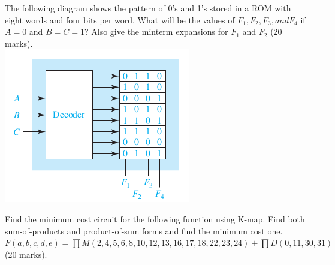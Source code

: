 \begin{prob}
  The following diagram shows the pattern of 0’s and 1’s stored in a ROM
  with eight words and four bits per word. What will be the values of $F_1 , F_2 ,
  F_3 , and F_4$ if $A=0$ and $B = C = 1$?
  Also give the minterm expansions for $F_1$ and $F_2$ (20 marks).\\
  \includegraphics[width=0.4\linewidth]{./media/ROM-minterms.png}
\end{prob}
\newpage

\begin{prob}
  Find the minimum cost circuit for the following function using K-map. Find both
  sum-of-products and product-of-sum forms and find the minimum cost one.\\
  $ F(a, b, c, d, e) = \prod M(2, 4, 5, 6, 8, 10, 12, 13, 16, 17, 18, 22, 23, 24)
   + \prod
  D(0, 11, 30, 31)$ (20 marks).
\end{prob}
\newpage